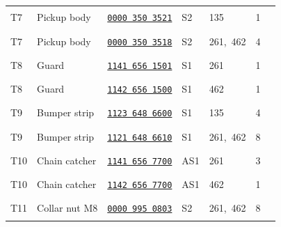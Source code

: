 \documentclass[10pt,letterpaper]{article}
\begin{document}
\begin{longtable}{@{}l>{\raggedright\arraybackslash}p{2.58in}p{1.23in}llrr@{}}
T7 & Pickup body & \href{https://rduncangt.github.io/frk-management/parts/00003503521/}{\texttt{0000 350 3521}} & \textcolor{frkSupervision}{S2} & \textcolor{frkApplication}{\mbox{135}} & 1 & \rule{0.23in}{0.3pt}\\

\rowcolor{black!6}T7 & Pickup body & \href{https://rduncangt.github.io/frk-management/parts/00003503518/}{\texttt{0000 350 3518}} & \textcolor{frkSupervision}{S2} & \textcolor{frkApplication}{\mbox{261, 462}} & 4 & \rule{0.23in}{0.3pt}\\

T8 & Guard & \href{https://rduncangt.github.io/frk-management/parts/11416561501/}{\texttt{1141 656 1501}} & \textcolor{frkSupervision}{S1} & \textcolor{frkApplication}{\mbox{261}} & 1 & \rule{0.23in}{0.3pt}\\

\rowcolor{black!6}T8 & Guard & \href{https://rduncangt.github.io/frk-management/parts/11426561500/}{\texttt{1142 656 1500}} & \textcolor{frkSupervision}{S1} & \textcolor{frkApplication}{\mbox{462}} & 1 & \rule{0.23in}{0.3pt}\\

T9 & Bumper strip & \href{https://rduncangt.github.io/frk-management/parts/11236486600/}{\texttt{1123 648 6600}} & \textcolor{frkSupervision}{S1} & \textcolor{frkApplication}{\mbox{135}} & 4 & \rule{0.23in}{0.3pt}\\

\rowcolor{black!6}T9 & Bumper strip & \href{https://rduncangt.github.io/frk-management/parts/11216486610/}{\texttt{1121 648 6610}} & \textcolor{frkSupervision}{S1} & \textcolor{frkApplication}{\mbox{261, 462}} & 8 & \rule{0.23in}{0.3pt}\\

T10 & Chain catcher & \href{https://rduncangt.github.io/frk-management/parts/11416567700/}{\texttt{1141 656 7700}} & \textcolor{frkSupervision}{AS1} & \textcolor{frkApplication}{\mbox{261}} & 3 & \rule{0.23in}{0.3pt}\\

\rowcolor{black!6}T10 & Chain catcher & \href{https://rduncangt.github.io/frk-management/parts/11426567700/}{\texttt{1142 656 7700}} & \textcolor{frkSupervision}{AS1} & \textcolor{frkApplication}{\mbox{462}} & 1 & \rule{0.23in}{0.3pt}\\

T11 & Collar nut M8 & \href{https://rduncangt.github.io/frk-management/parts/00009950803/}{\texttt{0000 995 0803}} & \textcolor{frkSupervision}{S2} & \textcolor{frkApplication}{\mbox{261, 462}} & 8 & \rule{0.23in}{0.3pt}\\


\end{longtable}
\end{document}
